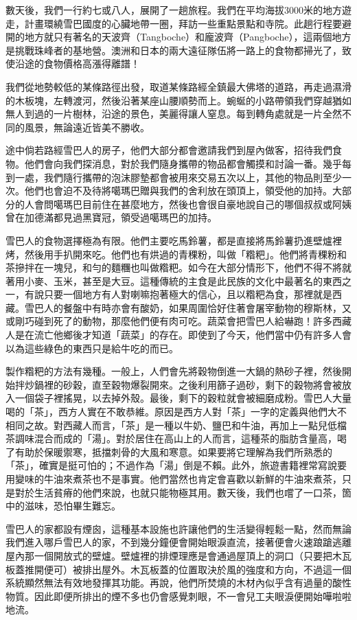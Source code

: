 數天後，我們一行約七或八人，展開了一趟旅程。我們在平均海拔3000米的地方遊走，計畫環繞雪巴國度的心臟地帶一圈，拜訪一些重點景點和寺院。此趟行程要避開的地方就只有著名的天波齊（Tangboche）和龐波齊（Pangboche），這兩個地方是挑戰珠峰者的基地營。澳洲和日本的兩大遠征隊伍將一路上的食物都掃光了，致使沿途的食物價格高漲得離譜！

我們從地勢較低的某條路徑出發，取道某條路經全鎮最大佛塔的道路，再走過濕滑的木板塊，左轉渡河，然後沿著某座山腰順勢而上。蜿蜒的小路帶領我們穿越猶如無人到過的一片樹林，沿途的景色，美麗得讓人窒息。每到轉角處就是一片全然不同的風景，無論遠近皆美不勝收。

途中倘若路經雪巴人的房子，他們大部分都會邀請我們到屋內做客，招待我們食物。他們會向我們探消息，對於我們隨身攜帶的物品都會觸摸和討論一番。幾乎每到一處，我們隨行攜帶的泡沫膠墊都會被用來交易五次以上，其他的物品則至少一次。他們也會迫不及待將噶瑪巴贈與我們的舍利放在頭頂上，領受他的加持。大部分的人會問噶瑪巴目前住在甚麼地方，然後也會很自豪地說自己的哪個叔叔或阿姨曾在加德滿都見過黑寶冠，領受過噶瑪巴的加持。

雪巴人的食物選擇極為有限。他們主要吃馬鈴薯，都是直接將馬鈴薯扔進壁爐裡烤，然後用手扒開來吃。他們也有烘過的青稞粉，叫做「糌粑」。他們將青稞粉和茶摻拌在一塊兒，和勻的麵糰也叫做糌粑。如今在大部分情形下，他們不得不將就著用小麥、玉米，甚至是大豆。這種傳統的主食是此民族的文化中最著名的東西之一，有說只要一個地方有人對喇嘛抱著極大的信心，且以糌粑為食，那裡就是西藏。雪巴人的餐盤中有時亦會有酸奶，如果周圍恰好住著會屠宰動物的穆斯林，又或剛巧碰到死了的動物，那麼他們便有肉可吃。蔬菜會把雪巴人給嚇跑！許多西藏人是在流亡他鄉後才知道「蔬菜」的存在。即使到了今天，他們當中仍有許多人會以為這些綠色的東西只是給牛吃的而已。

製作糌粑的方法有幾種。一般上，人們會先將穀物倒進一大鍋的熱砂子裡，然後開始拌炒鍋裡的砂穀，直至穀物爆裂開來。之後利用篩子過砂，剩下的穀物將會被放入一個袋子裡搖晃，以去掉外殼。最後，剩下的穀粒就會被細磨成粉。雪巴人大量喝的「茶」，西方人實在不敢恭維。原因是西方人對「茶」一字的定義與他們大不相同之故。對西藏人而言，「茶」是一種以牛奶、鹽巴和牛油，再加上一點兒低檔茶調味混合而成的「湯」。對於居住在高山上的人而言，這種茶的脂肪含量高，喝了有助於保暖禦寒，抵擋刺骨的大風和寒意。如果要將它理解為我們所熟悉的「茶」，確實是挺可怕的；不過作為「湯」倒是不賴。此外，旅遊書籍裡常寫說要用變味的牛油來煮茶也不是事實。他們當然也肯定會喜歡以新鮮的牛油來煮茶，只是對於生活貧瘠的他們來說，也就只能物極其用。數天後，我們也嚐了一口茶，箇中的滋味，恐怕畢生難忘。

雪巴人的家都設有煙囪，這種基本設施也許讓他們的生活變得輕鬆一點，然而無論我們進入哪戶雪巴人的家，不到幾分鐘便會開始眼淚直流，接著便會火速踉蹌逃離屋內那一個開放式的壁爐。壁爐裡的排煙理應是會通過屋頂上的洞口（只要把木瓦板蓋推開便可）被排出屋外。木瓦板蓋的位置取決於風的強度和方向，不過這一個系統顯然無法有效地發揮其功能。再說，他們所焚燒的木材內似乎含有過量的酸性物質。因此即便所排出的煙不多也仍會感覺刺眼，不一會兒工夫眼淚便開始嘩啦啦地流。

